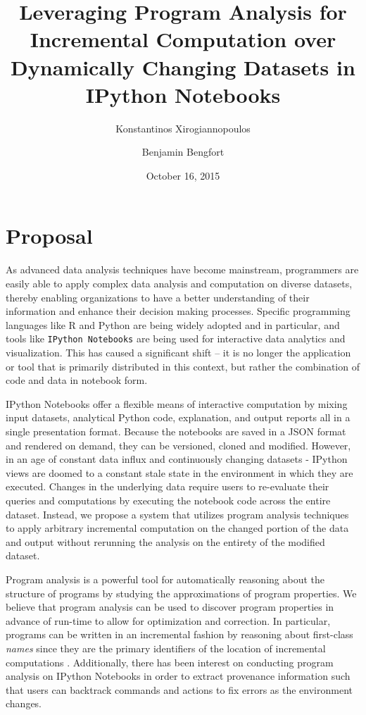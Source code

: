 \documentclass[11pt,letterpaper]{article}
\begin{document}
\title{Leveraging Program Analysis for Incremental Computation over Dynamically Changing Datasets in IPython Notebooks}
\author[ ]{Konstantinos Xirogiannopoulos}
\author[ ]{Benjamin Bengfort}

\date{October 16, 2015}

\maketitle
\section{Proposal}

As advanced data analysis techniques have become mainstream, programmers are easily able to apply complex data analysis and computation on diverse datasets, thereby enabling organizations to have a better understanding of their information and enhance their decision making processes. Specific programming languages like R and Python are being widely adopted and in particular, and tools like \texttt{IPython Notebooks} \cite{perez2007ipython} are being used for interactive data analytics and visualization. This has caused a significant shift -- it is no longer the application or tool that is primarily distributed in this context, but rather the combination of code and data in notebook form.

IPython Notebooks offer a flexible means of interactive computation by mixing input datasets, analytical Python code, explanation, and output reports all in a single presentation format. Because the notebooks are saved in a JSON format and rendered on demand, they can be versioned, cloned and modified. However, in an age of constant data influx and continuously changing datasets - IPython views are doomed to a constant stale state in the environment in which they are executed. Changes in the underlying data require users to re-evaluate their queries and computations by executing the notebook code across the entire dataset. Instead, we propose a system that utilizes program analysis techniques to apply arbitrary incremental computation on the changed portion of the data and output without rerunning the analysis on the entirety of the modified dataset.

Program analysis is a powerful tool for automatically reasoning about the structure of programs by studying the approximations of program properties. We believe that program analysis can be used to discover program properties in advance of run-time to allow for optimization and correction. In particular, programs can be written in an incremental fashion by reasoning about first-class \textit{names} since they are the primary identifiers of the location of incremental computations \cite{hammer2015incremental}. Additionally, there has been interest on conducting program analysis on IPython Notebooks in order to extract provenance information \cite{pimentel2015collecting} such that users can backtrack commands and actions to fix errors as the environment changes.
\end{document}
